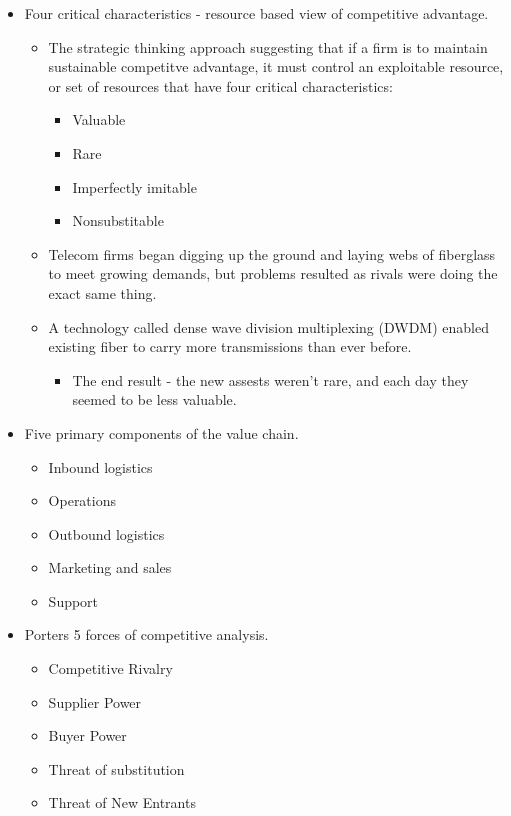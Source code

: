 \documentclass{report}
\begin{document}
\begin{itemize}
\begin{itemize}[label=$\circ$]
        \end{itemize}
    \item Four critical characteristics - resource based view of competitive advantage.
        \begin{itemize}[label=$\circ$]
            \item The strategic thinking approach suggesting that if a firm is to maintain sustainable competitve advantage, it must control an exploitable resource, or set of resources that have four critical characteristics:
        \begin{itemize}[label=$\circ$]
            \item Valuable
            \item Rare
            \item Imperfectly imitable
            \item Nonsubstitable
        \end{itemize}
    \item Telecom firms began digging up the ground and laying webs of fiberglass to meet growing demands, but problems resulted as rivals were doing the exact same thing.
    \item A technology called dense wave division multiplexing (DWDM) enabled existing fiber to carry more transmissions than ever before.
\begin{itemize}[label=$\circ$]
    \item The end result - the new assests weren't rare, and each day they seemed to be less valuable.
\end{itemize}
        \end{itemize} 
    \item Five primary components of the value chain.
        \begin{itemize}[label=$\circ$]
            \item Inbound logistics
            \item Operations
            \item Outbound logistics
            \item Marketing and sales
            \item Support
        \end{itemize}
    \item Porters 5 forces of competitive analysis.
        \begin{itemize}[label=$\circ$]
            \item Competitive Rivalry
            \item Supplier Power
            \item Buyer Power
            \item Threat of substitution
            \item Threat of New Entrants
        \end{itemize}
\end{itemize}
\end{document}
